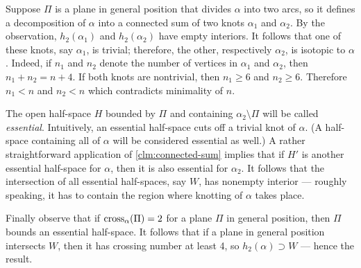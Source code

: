 Suppose $\Pi$ is a plane in general position that divides $\alpha$ into two arcs, so it defines a decomposition of $\alpha$ into a connected sum of two knots $\alpha_1$ and $\alpha_2$.
By the observation, $h_2(\alpha_1)$ and $h_2(\alpha_2)$ have empty interiors.
It follows that one of these knots, say $\alpha_1$, is trivial;
therefore, the other, respectively $\alpha_2$, is isotopic to $\alpha$.
Indeed, if $n_1$ and $n_2$ denote the number of vertices in $\alpha_1$ and $\alpha_2$, then $n_1+n_2=n+4$. 
If both knots are nontrivial, then $n_1\ge 6$ and $n_2\ge 6$.
Therefore $n_1<n$ and $n_2<n$ which contradicts minimality of $n$.

The open half-space $H$ bounded by $\Pi$ and containing $\alpha_2\setminus\Pi$ will be called \emph{essential}. Intuitively, an essential half-space cuts off
a trivial knot of $\alpha$. (A half-space containing all of $\alpha$ will be considered essential as well.)
A rather straightforward application of \ref{clm:connected-sum} implies that if $H'$ is another essential half-space for $\alpha$, then it is also essential for $\alpha_2$.
It follows that the intersection of all essential half-spaces, say $W$, has nonempty interior --- roughly speaking, it has to contain the region where knotting of $\alpha$ takes place.

Finally observe that if $\mathop{\rm cross}\nolimits_\alpha(\Pi)=2$ for a plane $\Pi$ in general position, then $\Pi$ bounds an essential half-space. 
It follows that if a plane in general position intersects $W$, then it has  crossing number at least 4,
so $h_2(\alpha)\supset W$ --- hence the result.
\qeds

